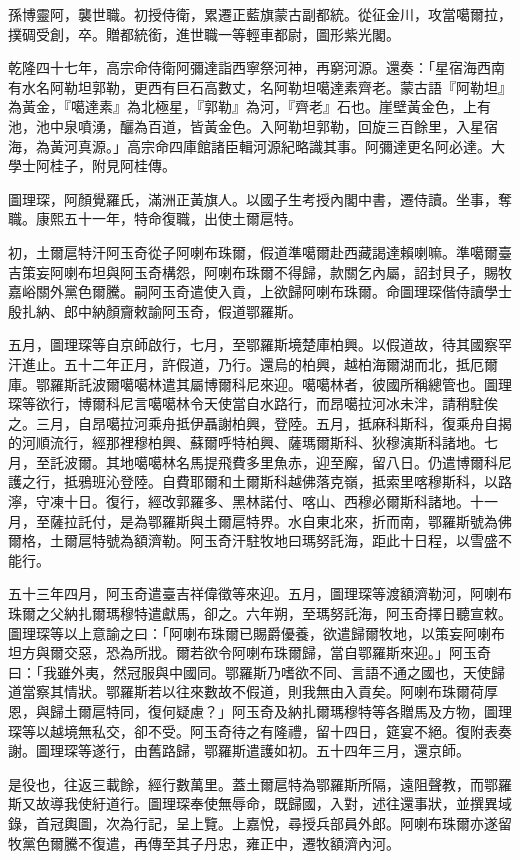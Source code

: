 \begin{pinyinscope}
孫博靈阿，襲世職。初授侍衛，累遷正藍旗蒙古副都統。從征金川，攻當噶爾拉，撲碉受創，卒。贈都統銜，進世職一等輕車都尉，圖形紫光閣。

乾隆四十七年，高宗命侍衛阿彌達詣西寧祭河神，再窮河源。還奏：「星宿海西南有水名阿勒坦郭勒，更西有巨石高數丈，名阿勒坦噶達素齊老。蒙古語『阿勒坦』為黃金，『噶達素』為北極星，『郭勒』為河，『齊老』石也。崖壁黃金色，上有池，池中泉噴湧，釃為百道，皆黃金色。入阿勒坦郭勒，回旋三百餘里，入星宿海，為黃河真源。」高宗命四庫館諸臣輯河源紀略識其事。阿彌達更名阿必達。大學士阿桂子，附見阿桂傳。

圖理琛，阿顏覺羅氏，滿洲正黃旗人。以國子生考授內閣中書，遷侍讀。坐事，奪職。康熙五十一年，特命復職，出使土爾扈特。

初，土爾扈特汗阿玉奇從子阿喇布珠爾，假道準噶爾赴西藏謁達賴喇嘛。準噶爾臺吉策妄阿喇布坦與阿玉奇構怨，阿喇布珠爾不得歸，款關乞內屬，詔封貝子，賜牧嘉峪關外黨色爾騰。嗣阿玉奇遣使入貢，上欲歸阿喇布珠爾。命圖理琛偕侍讀學士殷扎納、郎中納顏齎敕諭阿玉奇，假道鄂羅斯。

五月，圖理琛等自京師啟行，七月，至鄂羅斯境楚庫柏興。以假道故，待其國察罕汗進止。五十二年正月，許假道，乃行。還烏的柏興，越柏海爾湖而北，抵厄爾庫。鄂羅斯託波爾噶噶林遣其屬博爾科尼來迎。噶噶林者，彼國所稱總管也。圖理琛等欲行，博爾科尼言噶噶林令天使當自水路行，而昂噶拉河冰未泮，請稍駐俟之。三月，自昂噶拉河乘舟抵伊聶謝柏興，登陸。五月，抵麻科斯科，復乘舟自揭的河順流行，經那裡穆柏興、蘇爾呼特柏興、薩瑪爾斯科、狄穆演斯科諸地。七月，至託波爾。其地噶噶林名馬提飛費多里魚赤，迎至廨，留八日。仍遣博爾科尼護之行，抵鴉班沁登陸。自費耶爾和土爾斯科越佛落克嶺，抵索里喀穆斯科，以路濘，守凍十日。復行，經改郭羅多、黑林諾付、喀山、西穆必爾斯科諸地。十一月，至薩拉託付，是為鄂羅斯與土爾扈特界。水自東北來，折而南，鄂羅斯號為佛爾格，土爾扈特號為額濟勒。阿玉奇汗駐牧地曰瑪努託海，距此十日程，以雪盛不能行。

五十三年四月，阿玉奇遣臺吉祥偉徵等來迎。五月，圖理琛等渡額濟勒河，阿喇布珠爾之父納扎爾瑪穆特遣獻馬，卻之。六年朔，至瑪努託海，阿玉奇擇日聽宣敕。圖理琛等以上意諭之曰：「阿喇布珠爾已賜爵優養，欲遣歸爾牧地，以策妄阿喇布坦方與爾交惡，恐為所戕。爾若欲令阿喇布珠爾歸，當自鄂羅斯來迎。」阿玉奇曰：「我雖外夷，然冠服與中國同。鄂羅斯乃嗜欲不同、言語不通之國也，天使歸道當察其情狀。鄂羅斯若以往來數故不假道，則我無由入貢矣。阿喇布珠爾荷厚恩，與歸土爾扈特同，復何疑慮？」阿玉奇及納扎爾瑪穆特等各贈馬及方物，圖理琛等以越境無私交，卻不受。阿玉奇待之有隆禮，留十四日，筵宴不絕。復附表奏謝。圖理琛等遂行，由舊路歸，鄂羅斯遣護如初。五十四年三月，還京師。

是役也，往返三載餘，經行數萬里。蓋土爾扈特為鄂羅斯所隔，遠阻聲教，而鄂羅斯又故導我使紆道行。圖理琛奉使無辱命，既歸國，入對，述往還事狀，並撰異域錄，首冠輿圖，次為行記，呈上覽。上嘉悅，尋授兵部員外郎。阿喇布珠爾亦遂留牧黨色爾騰不復遣，再傳至其子丹忠，雍正中，遷牧額濟內河。


\end{pinyinscope}
